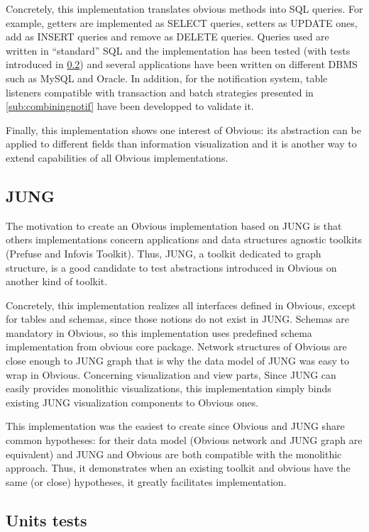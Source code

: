 Concretely, this implementation  translates obvious methods into SQL queries. For example, getters are implemented as SELECT queries, setters as UPDATE ones, add as INSERT queries and remove as DELETE queries. Queries used are written in "`standard"' SQL and the implementation has been tested (with tests introduced in \ref{sub:unittests}) and several applications have been written on different DBMS such as MySQL and Oracle. In addition, for the notification system, table listeners compatible with transaction and batch strategies presented in \ref{sub:combiningnotif} have been developped to validate it.

Finally, this implementation shows one interest of Obvious: its abstraction can be applied to different fields than information visualization and it is another way to extend capabilities of all Obvious implementations.

\subsection{JUNG}

The motivation to create an Obvious implementation based on JUNG is that others implementations concern applications and data structures agnostic toolkits (Prefuse and Infovis Toolkit). Thus, JUNG, a toolkit dedicated to graph structure, is a good candidate to test abstractions introduced in Obvious on another kind of toolkit. 

Concretely, this implementation realizes all interfaces defined in Obvious, except for tables and schemas, since those notions do not exist in JUNG. Schemas are mandatory in Obvious, so this implementation uses predefined schema implementation from obvious core package. Network structures of Obvious are close enough to JUNG graph that is why the data model of JUNG was easy to wrap in Obvious. Concerning visualization and view parts, Since JUNG can easily provides monolithic visualizations, this implementation simply binds existing JUNG visualization components to Obvious ones.

This implementation was the easiest to create since Obvious and JUNG share common hypotheses: for their data model (Obvious network and JUNG graph are equivalent) and JUNG and Obvious are both compatible with the monolithic approach. Thus, it demonstrates when an existing toolkit and obvious have the same (or close) hypotheses, it greatly facilitates implementation.

\subsection{Units tests}
\label{sub:unittests}

